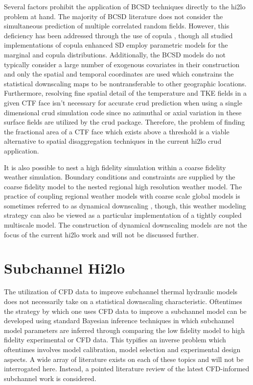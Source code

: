 Several factors prohibit the application of BCSD techniques directly to the hi2lo problem at hand.  The majority of BCSD literature does not consider the simultaneous prediction of multiple correlated random fields. However, this deficiency has been addressed through the use of copula \cite{alaya2014}, though all studied implementations of copula enhanced SD employ parametric models for the marginal and copula distributions.  Additionally, the BCSD models do not typically consider a large number of exogenous covariates in their construction and only the spatial and temporal coordinates are used which constrains the statistical downscaling maps to be nontransferable to other geographic locations.  Furthermore, resolving fine spatial detail of the temperature and TKE fields in a given CTF face isn't necessary for accurate crud prediction when using a single dimensional crud simulation code since no azimuthal or axial variation in these surface fields are utilized by the crud package.  Therefore, the problem of finding the fractional area of a CTF face which exists above a threshold is a viable alternative to spatial disaggregation techniques in the current hi2lo crud application.

It is also possible to nest a high fidelity simulation within a coarse fidelity weather simulation. Boundary conditions and constraints are supplied by the coarse fidelity model to the nested regional high resolution weather model.  The practice of coupling regional weather models with coarse scale global models is sometimes referred to as dynamical downscaling \cite{Caldwell2009}, though, this weather modeling strategy can also be viewed as a particular implementation of a tightly coupled multiscale model.  The construction of dynamical downscaling models are not the focus of the current hi2lo work and will not be discussed further.



\section{Subchannel Hi2lo}

The utilization of CFD data to improve subchannel thermal hydraulic models does not necessarily take on a statistical downscaling characteristic.  Oftentimes the strategy by which one uses CFD data to improve a subchannel model can be developed using standard Bayesian inference techniques in which subchannel model parameters are inferred through comparing the low fidelity model to high fidelity experimental or CFD data.  This typifies an inverse problem which oftentimes involves  model calibration, model selection and experimental design aspects.  A wide array of literature exists on each of these topics and will not be interrogated here.  Instead, a pointed literature review of the latest CFD-informed subchannel work is considered.

